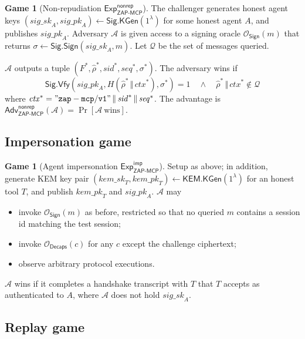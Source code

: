 \documentclass[11pt,a4paper]{article}
\theoremstyle{definition}
\newtheorem{game}[theorem]{Game}
\theoremstyle{remark}
\newcommand{\zapmcp}{\textsf{ZAP-MCP}\xspace}
\newcommand{\Adv}{\mathsf{Adv}}
\newcommand{\Exp}{\mathsf{Exp}}
\newcommand{\KEM}{\textsf{KEM}}
\newcommand{\Sign}{\textsf{Sig}}
\begin{document}
\begin{game}[Non-repudiation $\Exp^{\mathsf{nonrep}}_{\zapmcp{}}$]
\label{game:nonrep}
The challenger generates honest agent keys
$(\mathit{sig\_sk}_A, \mathit{sig\_pk}_A) \leftarrow
\Sign.\mathsf{KGen}(1^\lambda)$ for some honest agent $A$, and
publishes $\mathit{sig\_pk}_A$. Adversary $\mathcal{A}$ is given access
to a signing oracle $\mathcal{O}_{\mathsf{Sign}}(m)$ that returns
$\sigma \leftarrow \Sign.\mathsf{Sign}(\mathit{sig\_sk}_A, m)$. Let
$\mathcal{Q}$ be the set of messages queried.

$\mathcal{A}$ outputs a tuple $(F^*, \hat{\rho}^*, \mathit{sid}^*,
\mathit{seq}^*, \sigma^*)$. The adversary wins if
\[
\Sign.\mathsf{Vfy}(\mathit{sig\_pk}_A,
H(\hat{\rho}^* \,\Vert\, \mathit{ctx}^*), \sigma^*) = 1
\quad \wedge \quad
\hat{\rho}^* \,\Vert\, \mathit{ctx}^* \notin \mathcal{Q}
\]
where $\mathit{ctx}^* = \mathtt{"zap-mcp/v1"} \,\Vert\, \mathit{sid}^*
\,\Vert\, \mathit{seq}^*$.
The advantage is
$\Adv^{\mathsf{nonrep}}_{\zapmcp{}}(\mathcal{A}) =
\Pr[\mathcal{A}\ \text{wins}]$.
\end{game}

\subsection{Impersonation game}

\begin{game}[Agent impersonation
$\Exp^{\mathsf{imp}}_{\zapmcp{}}$]\label{game:imp}
Setup as above; in addition, generate KEM key pair
$(\mathit{kem\_sk}_T, \mathit{kem\_pk}_T) \leftarrow
\KEM.\mathsf{KGen}(1^\lambda)$ for an honest tool $T$, and publish
$\mathit{kem\_pk}_T$ and $\mathit{sig\_pk}_A$. $\mathcal{A}$ may
\begin{itemize}[leftmargin=2em,itemsep=0.2em]
\item invoke $\mathcal{O}_{\mathsf{Sign}}(m)$ as before, restricted so
that no queried $m$ contains a session id matching the test session;
\item invoke $\mathcal{O}_{\mathsf{Decaps}}(c)$ for any $c$ except the
challenge ciphertext;
\item observe arbitrary protocol executions.
\end{itemize}
$\mathcal{A}$ wins if it completes a handshake transcript with $T$ that
$T$ accepts as authenticated to $A$, where $\mathcal{A}$ does not hold
$\mathit{sig\_sk}_A$.
\end{game}

\subsection{Replay game}
\end{document}
